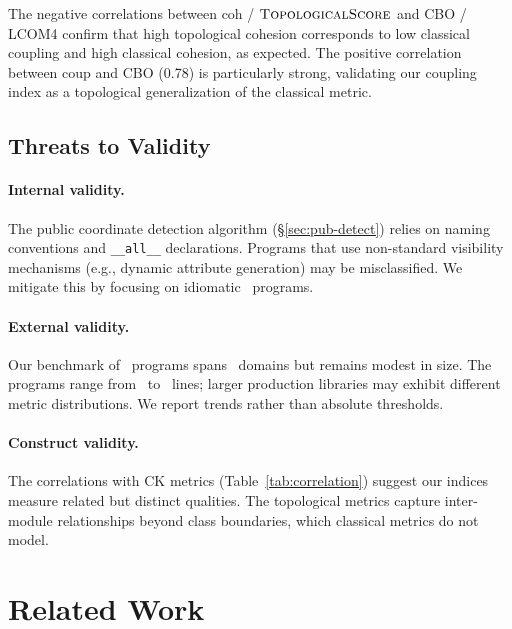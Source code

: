 \documentclass[11pt]{article}
\newcommand{\TopoScore}{\textsc{TopologicalScore}}
\newcommand{\CohIndex}{\mathrm{coh}}
\newcommand{\CoupIndex}{\mathrm{coup}}
\begin{document}
The negative correlations between $\CohIndex$ / $\TopoScore$ and
CBO / LCOM4 confirm that high topological cohesion corresponds to low
classical coupling and high classical cohesion, as expected.  The
positive correlation between $\CoupIndex$ and CBO (0.78) is particularly
strong, validating our coupling index as a topological generalization of
the classical metric.

\subsection{Threats to Validity}\label{sec:threats}

\paragraph{Internal validity.}
The public coordinate detection algorithm (§\ref{sec:pub-detect}) relies
on naming conventions and \texttt{\_\_all\_\_} declarations.  Programs
that use non-standard visibility mechanisms (e.g., dynamic attribute
generation) may be misclassified.  We mitigate this by focusing on
idiomatic \Python\ programs.

\paragraph{External validity.}
Our benchmark of \compTotalPrograms\ programs spans \expDomainCount\
domains but remains modest in size.  The programs range from
\compTinyMeanLines\ to \compLargeMeanLines\ lines; larger production
libraries may exhibit different metric distributions.  We report trends
rather than absolute thresholds.

\paragraph{Construct validity.}
The correlations with CK metrics (Table~\ref{tab:correlation}) suggest
our indices measure related but distinct qualities.  The topological
metrics capture inter-module relationships beyond class boundaries, which
classical metrics do not model.

\section{Related Work}\label{sec:related}
\end{document}
